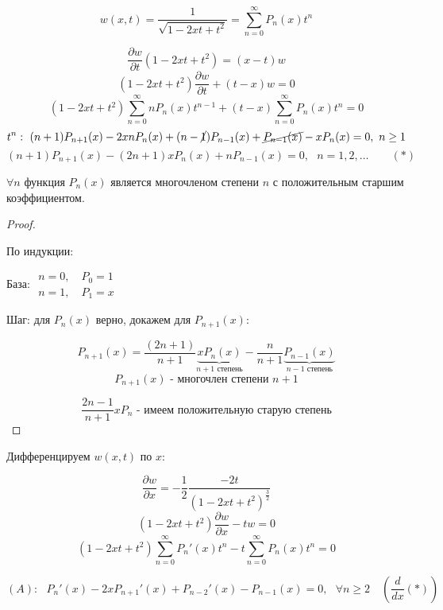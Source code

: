 \documentclass[12pt, a4paper]{report}
\begin{document}
\fi


\[ w(x, t ) = \frac{1 }{\sqrt{1 - 2 xt + t ^2 }} = \sum_{n=0 }^{ \infty  } P_n (x ) t^n  \] 

\[ \frac{\partial  w }{\partial  t } (1 - 2x t +t ^2 ) = (x -t )w   \] 
\[ (1 - 2x t + t ^2 ) \frac{\partial  w }{\partial  t } + (t -x  ) w = 0  \] 
\[ (1 - 2xt + t ^2   ) \sum_{n =0 }^{\infty  } n P_n (x ) t^{ n -1 } + (t -x ) \sum_{n =0} ^{\infty  } P_n (x ) t^n =0   \] 
\[t^{n } : \text{ }   (n+1 ) P_{n+1 } (x )- 2 x nP_n(x ) + (n-\cancel{1} )P_{n-1 } ( x )+ \cancel{P_{n-1 } (x )} - x P_n( x )= 0 ,\text{ }  n \ge 1 \]  
\[ (n +1 )P_{n+1 } (x ) - (2 n +1 ) x P_n( x ) + n P_{n-1 } (x ) = 0 , \text{ } n =1,2, \ldots  \quad \quad (*)\] 

\begin{lemma}
    \( \forall  n  \) функция \( P_n(x ) \) является многочленом степени \( n \) с положительным старшим коэффициентом.
\end{lemma}

\begin{proof} \(  \) 

    По индукции: 

    База: \( \begin{aligned}
    n = 0 ,\quad  P_0 =1 \\ 
    n=1 ,\quad  P_1 =  x
    \end{aligned} \) 

    Шаг: для \( P_n(x ) \) верно, докажем для \( P_{n+1} (x) \): 

    \[ P_{n+1 } (x ) = \frac{(2 n +1 )}{n+1      } \underbrace{x P_n(x )}_{n+ 1 \text{ степень} } - \frac{n }{n+1 } \underbrace{P_{n-1 }  (x )}_{n-1 \text{ степень} }   \] 
    \[ P _{n+1 }  ( x) \text{  - многочлен степени }  n+ 1  \] 

    \[ \frac{2n -1 }{n+1 }x P_n \text{  - имеем положительную старую степень}   \] 
\end{proof}

Дифференцируем  \( w(x,t ) \) по \( x \): 

\[ \frac{\partial  w }{\partial  x } =  -\frac{1}{2}  \frac{- 2t  }{(1 - 2xt + t ^2 )^{\frac{3}{2} } }  \] 
\[ (1 - 2 xt +t ^2  ) \frac{\partial  w}{\partial  x } - t w = 0   \] 
\[ (1 - 2 xt  +t ^2  ) \sum_{n =0 }^{ \infty  } P_n ' (x ) t ^{ n }  - t \sum_{n =0 }^{\infty  } P_n(x ) t^n = 0  \] 

\[ (A) : \text{ }  P_n '(x ) -2 x P_{n+1 } ' (x ) + P_{n-2 } ' (x ) - P_{n-1 } (x ) =0 ,\text{ } \forall  n \ge 2 \quad \left( \frac{d }{dx }(*)  \right)  \] 
\end{document}

